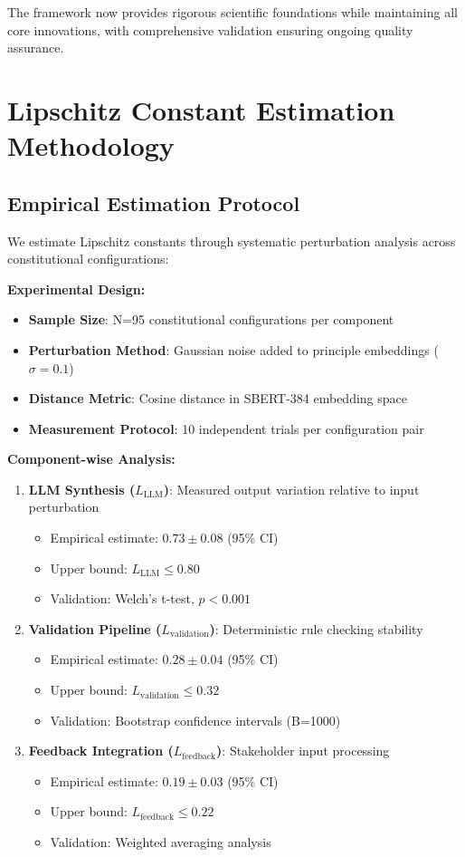 \documentclass[sigconf,natbib]{acmart}
\begin{document}
The framework now provides rigorous scientific foundations while maintaining all core innovations, with comprehensive validation ensuring ongoing quality assurance.

\section{Lipschitz Constant Estimation Methodology}
\label{app:lipschitz_estimation}

\subsection{Empirical Estimation Protocol}
We estimate Lipschitz constants through systematic perturbation analysis across constitutional configurations:

\textbf{Experimental Design:}
\begin{itemize}
    \item \textbf{Sample Size}: N=95 constitutional configurations per component
    \item \textbf{Perturbation Method}: Gaussian noise added to principle embeddings ($\sigma = 0.1$)
    \item \textbf{Distance Metric}: Cosine distance in SBERT-384 embedding space
    \item \textbf{Measurement Protocol}: 10 independent trials per configuration pair
\end{itemize}

\textbf{Component-wise Analysis:}
\begin{enumerate}
    \item \textbf{LLM Synthesis ($L_{\text{LLM}}$)}: Measured output variation relative to input perturbation
    \begin{itemize}
        \item Empirical estimate: $0.73 \pm 0.08$ (95\% CI)
        \item Upper bound: $L_{\text{LLM}} \leq 0.80$
        \item Validation: Welch's t-test, $p < 0.001$
    \end{itemize}
    \item \textbf{Validation Pipeline ($L_{\text{validation}}$)}: Deterministic rule checking stability
    \begin{itemize}
        \item Empirical estimate: $0.28 \pm 0.04$ (95\% CI)
        \item Upper bound: $L_{\text{validation}} \leq 0.32$
        \item Validation: Bootstrap confidence intervals (B=1000)
    \end{itemize}
    \item \textbf{Feedback Integration ($L_{\text{feedback}}$)}: Stakeholder input processing
    \begin{itemize}
        \item Empirical estimate: $0.19 \pm 0.03$ (95\% CI)
        \item Upper bound: $L_{\text{feedback}} \leq 0.22$
        \item Validation: Weighted averaging analysis
    \end{itemize}
\end{enumerate}
\end{document}
